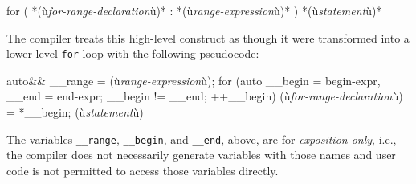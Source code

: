 
\begin{emcppslisting}[emcppsignore={grammar, not code, but leave as c++}]
for ( *(ù{\it{for-range-declaration}}ù)* : *(ù{\it{range-expression}}ù)* ) *(ù{\it{statement}}ù)*
\end{emcppslisting}
    

\noindent The compiler treats this high-level construct as though it were
transformed into a lower-level \lstinline!for! loop with the following
pseudocode:


\begin{emcppslisting}[emcppsignore={grammar, not code, but leave as c++}]
{
    auto&& __range = (ù{\it{range-expression}}ù);
    for (auto __begin = begin-expr, __end = end-expr;
        __begin != __end;
        ++__begin)
    {
        (ù{\it{for-range-declaration}}ù) = *__begin;
        (ù{\it{statement}}ù)
    }
}
\end{emcppslisting}
    

\noindent The variables \lstinline!__range!, \lstinline!__begin!, and
\lstinline!__end!, above, are for \emph{exposition only}, i.e., the
compiler does not necessarily generate variables with those names and
user code is not permitted to access those variables directly.

